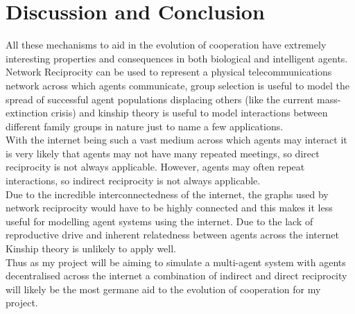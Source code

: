 \documentclass[twoside,twocolumn]{article}
\begin{document}

\section{Discussion and Conclusion}
All these mechanisms to aid in the evolution of cooperation have extremely interesting properties and consequences in both biological and intelligent agents. Network Reciprocity can be used to represent a physical telecommunications network across which agents communicate, group selection is useful to model the spread of successful agent populations displacing others (like the current mass-extinction crisis) and kinship theory is useful to model interactions between different family groups in nature just to name a few applications.\\
With the internet being such a vast medium across which agents may interact it is very likely that agents may not have many repeated meetings, so direct reciprocity is not always applicable. However, agents may often repeat interactions, so indirect reciprocity is not always applicable.\\
Due to the incredible interconnectedness of the internet, the graphs used by network reciprocity would have to be highly connected and this makes it less useful for modelling agent systems using the internet. Due to the lack of reproductive drive and inherent relatedness between agents across the internet Kinship theory is unlikely to apply well.\\
Thus as my project will be aiming to simulate a multi-agent system with agents decentralised across the internet a combination of indirect and direct reciprocity will likely be the most germane aid to the evolution of cooperation for my project.


{}


\end{document}
